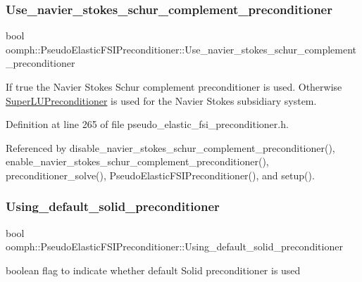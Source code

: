 \subsubsection{\texorpdfstring{Use\+\_\+navier\+\_\+stokes\+\_\+schur\+\_\+complement\+\_\+preconditioner}{Use\_navier\_stokes\_schur\_complement\_preconditioner}}
{\footnotesize\ttfamily bool oomph\+::\+Pseudo\+Elastic\+F\+S\+I\+Preconditioner\+::\+Use\+\_\+navier\+\_\+stokes\+\_\+schur\+\_\+complement\+\_\+preconditioner\hspace{0.3cm}{\ttfamily [private]}}



If true the Navier Stokes Schur complement preconditioner is used. Otherwise \hyperlink{classoomph_1_1SuperLUPreconditioner}{Super\+L\+U\+Preconditioner} is used for the Navier Stokes subsidiary system. 



Definition at line 265 of file pseudo\+\_\+elastic\+\_\+fsi\+\_\+preconditioner.\+h.



Referenced by disable\+\_\+navier\+\_\+stokes\+\_\+schur\+\_\+complement\+\_\+preconditioner(), enable\+\_\+navier\+\_\+stokes\+\_\+schur\+\_\+complement\+\_\+preconditioner(), preconditioner\+\_\+solve(), Pseudo\+Elastic\+F\+S\+I\+Preconditioner(), and setup().

\mbox{\label{classoomph_1_1PseudoElasticFSIPreconditioner_aab116f252418ca092f7e6f0f75de6778}} 
\subsubsection{\texorpdfstring{Using\+\_\+default\+\_\+solid\+\_\+preconditioner}{Using\_default\_solid\_preconditioner}}
{\footnotesize\ttfamily bool oomph\+::\+Pseudo\+Elastic\+F\+S\+I\+Preconditioner\+::\+Using\+\_\+default\+\_\+solid\+\_\+preconditioner\hspace{0.3cm}{\ttfamily [private]}}



boolean flag to indicate whether default Solid preconditioner is used 



